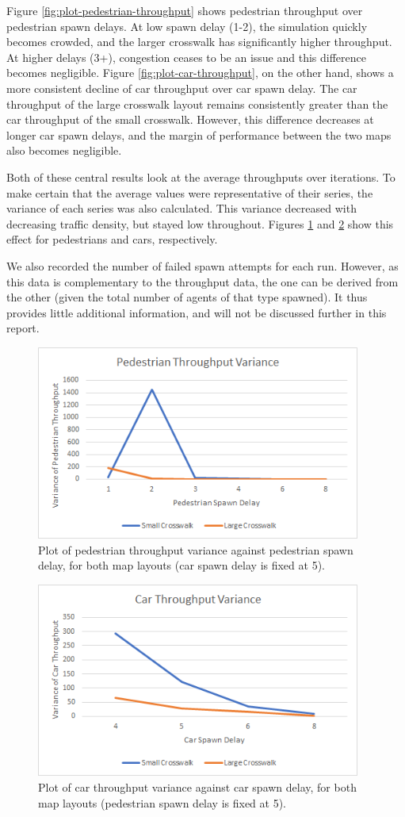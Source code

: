 Figure \ref{fig:plot-pedestrian-throughput} shows pedestrian throughput over pedestrian spawn delays. At low spawn delay (1-2), the simulation quickly becomes crowded, and the larger crosswalk has significantly higher throughput. At higher delays (3+), congestion ceases to be an issue and this difference becomes negligible. Figure \ref{fig:plot-car-throughput}, on the other hand, shows a more consistent decline of car throughput over car spawn delay. The car throughput of the large crosswalk layout remains consistently greater than the car throughput of the small crosswalk. However, this difference decreases at longer car spawn delays, and the margin of performance between the two maps also becomes negligible.

Both of these central results look at the average throughputs over iterations. To make certain that the average values were representative of their series, the variance of each series was also calculated. This variance decreased with decreasing traffic density, but stayed low throughout. Figures \ref{fig:plot-pedestrian-variance} and \ref{fig:plot-car-variance} show this effect for pedestrians and cars, respectively.

We also recorded the number of failed spawn attempts for each run. However, as this data is complementary to the throughput data, the one can be derived from the other (given the total number of agents of that type spawned). It thus provides little additional information, and will not be discussed further in this report.

\begin{figure}[h]
    \centering
    \includegraphics[width=4.2in]{images/plot-pedestrian-variance.png}
    \caption{Plot of pedestrian throughput variance against pedestrian spawn delay, for both map layouts (car spawn delay is fixed at 5).}
    \label{fig:plot-pedestrian-variance}
\end{figure}

\begin{figure}[h]
    \centering
    \includegraphics[width=4.2in]{images/plot-car-variance.png}
    \caption{Plot of car throughput variance against car spawn delay, for both map layouts (pedestrian spawn delay is fixed at 5).}
    \label{fig:plot-car-variance}
\end{figure}